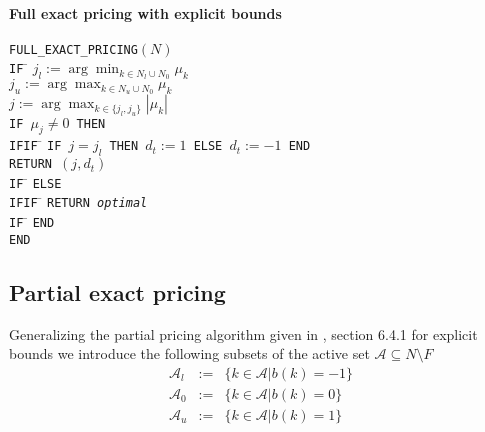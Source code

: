 \documentclass[a4paper]{article}
\begin{document}
\paragraph{Full exact pricing with explicit bounds}
\begin{tabbing}
\texttt{FULL\_EXACT\_PRICING$(N)$} \\
\texttt{IF} \= \kill
\> \texttt{$j_{l}:=\arg\min_{k \in N_{l} \cup
                               N_{0}}\mu_{k}$}  \\
\> \texttt{$j_{u}:=\arg\max_{k \in N_{u} \cup
                               N_{0}}\mu_{k}$}  \\
\> \texttt{$j:=\arg\max_{k \in \{j_{l}, j_{u}\}}\left|\mu_{k}\right|$}  \\
\> \texttt{IF $\mu_{j} \neq 0$ THEN} \\
\texttt{IFIF} \= \kill
\> \texttt{IF $j = j_{l}$ THEN $d_{t}:=1$ ELSE $d_{t}:=-1$ END} \\
\> \texttt{RETURN $(j, d_{t})$} \\
\texttt{IF} \= \kill
\> \texttt{ELSE} \\
\texttt{IFIF} \= \kill
\> \texttt{RETURN \emph{optimal}} \\
\texttt{IF} \= \kill
\> \texttt{END} \\
\texttt{END}
\end{tabbing}


\subsection{Partial exact pricing}
Generalizing the partial pricing algorithm given in \cite{Sven}, section 6.4.1 for explicit bounds we introduce the following subsets of the active set $\mathcal{A} \subseteq N \setminus F$ 
\begin{eqnarray}
\mathcal{A}_{l}&:=&\{k \in \mathcal{A}\left|\right. b\left(k\right)=-1\} \\
\mathcal{A}_{0}&:=&\{k \in \mathcal{A}\left|\right. b\left(k\right)=0\} \\
\mathcal{A}_{u}&:=&\{k \in \mathcal{A}\left|\right. b\left(k\right)=1\}
\end{eqnarray}
\end{document}
